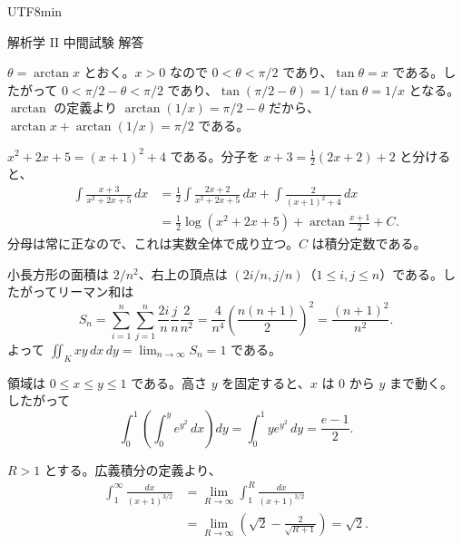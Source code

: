 \documentclass[a4paper,12pt]{article}
\newcommand{\ans}[1]{\par\vspace{0.8em}\noindent{\large 問題 #1}\quad}
\begin{document}
\ifPDFTeX
\begin{CJK}{UTF8}{min}
\fi

\begin{center}
{\Large 解析学 II 中間試験 解答}
\end{center}

\ans{1}
$\theta=\arctan x$ とおく。$x>0$ なので $0<\theta<\pi/2$ であり、$\tan\theta=x$ である。したがって $0<\pi/2-\theta<\pi/2$ であり、$\tan(\pi/2-\theta)=1/\tan\theta=1/x$ となる。$\arctan$ の定義より $\arctan(1/x)=\pi/2-\theta$ だから、$\arctan x+\arctan(1/x)=\pi/2$ である。

\ans{2}
$x^2+2x+5=(x+1)^2+4$ である。分子を $x+3=\tfrac12(2x+2)+2$ と分けると、
$$
\begin{aligned}
\int\frac{x+3}{x^2+2x+5}\,dx
&=\frac12\int\frac{2x+2}{x^2+2x+5}\,dx
   +\int\frac{2}{(x+1)^2+4}\,dx\\
&=\frac12\log(x^2+2x+5)+\arctan\frac{x+1}{2}+C .
\end{aligned}
$$
分母は常に正なので、これは実数全体で成り立つ。$C$ は積分定数である。

\ans{3}
小長方形の面積は $2/n^2$、右上の頂点は $(2i/n,j/n)$（$1\le i,j\le n$）である。したがってリーマン和は
$$
S_n=\sum_{i=1}^n\sum_{j=1}^n\frac{2i}{n}\frac{j}{n}\frac{2}{n^2}
=\frac{4}{n^4}\left(\frac{n(n+1)}{2}\right)^2
=\frac{(n+1)^2}{n^2}.
$$
よって $\iint_K xy\,dx\,dy=\lim_{n\to\infty}S_n=1$ である。

\ans{4}\par
\begin{minipage}[c]{0.26\linewidth}
\centering
{}
\end{minipage}\hfill
\begin{minipage}[c]{0.70\linewidth}
領域は $0\le x\le y\le 1$ である。高さ $y$ を固定すると、$x$ は $0$ から $y$ まで動く。したがって
$$
\int_0^1\left(\int_0^y e^{y^2}\,dx\right)dy
=\int_0^1 y e^{y^2}\,dy=\frac{e-1}{2}.
$$
\end{minipage}

\ans{5}
$R>1$ とする。広義積分の定義より、
$$
\begin{aligned}
\int_1^\infty\frac{dx}{(x+1)^{3/2}}
&=\lim_{R\to\infty}\int_1^R\frac{dx}{(x+1)^{3/2}}\\
&=\lim_{R\to\infty}\left(\sqrt{2}-\frac{2}{\sqrt{R+1}}\right)=\sqrt{2}.
\end{aligned}
$$


\end{CJK}
\end{document}
